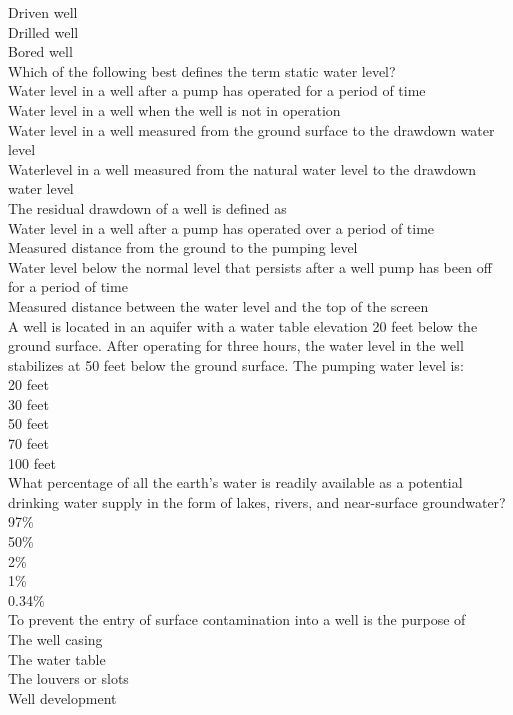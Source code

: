Driven well\\
Drilled well\\
Bored well\\
Which of the following best defines the term static water level?\\
Water level in a well after a pump has operated for a period of time\\
Water level in a well when the well is not in operation\\
Water level in a well measured from the ground surface to the drawdown water level\\
Waterlevel in a well measured from the natural water level to the drawdown water level\\
The residual drawdown of a well is defined as\\
Water level in a well after a pump has operated over a period of time\\
Measured distance from the ground to the pumping level\\
Water level below the normal level that persists after a well pump has been off for a period of time\\
Measured distance between the water level and the top of the screen\\
A well is located in an aquifer with a water table elevation 20 feet below the ground surface. After operating for three hours, the water level in the well stabilizes at 50 feet below the ground surface. The pumping water level is:\\
20 feet\\
30 feet\\
50 feet\\
70 feet\\
100 feet\\
What percentage of all the earth's water is readily available as a potential drinking water supply in the form of lakes, rivers, and near-surface groundwater?\\
97\%\\
50\%\\
2\%\\
1\%\\
0.34\%\\
To  prevent the entry of surface contamination into a well is the purpose of\\
The well casing\\
The water table\\
The louvers or slots\\
Well development\\
